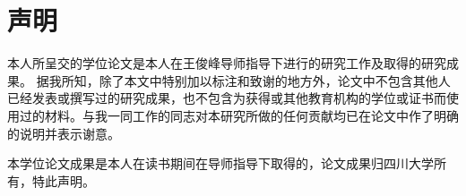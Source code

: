 
\chapter{声明}
本人所呈交的学位论文是本人在王俊峰导师指导下进行的研究工作及取得的研究成果。
据我所知，除了本文中特别加以标注和致谢的地方外，论文中不包含其他人已经发表或撰写过的研究成果，也不包含为获得{\universityname}或其他教育机构的学位或证书而使用过的材料。与我一同工作的同志对本研究所做的任何贡献均已在论文中作了明确的说明并表示谢意。

本学位论文成果是本人在{\universityname}读书期间在导师指导下取得的，论文成果归四川大学所有，特此声明。
\vspace{4cm}
\autograph
